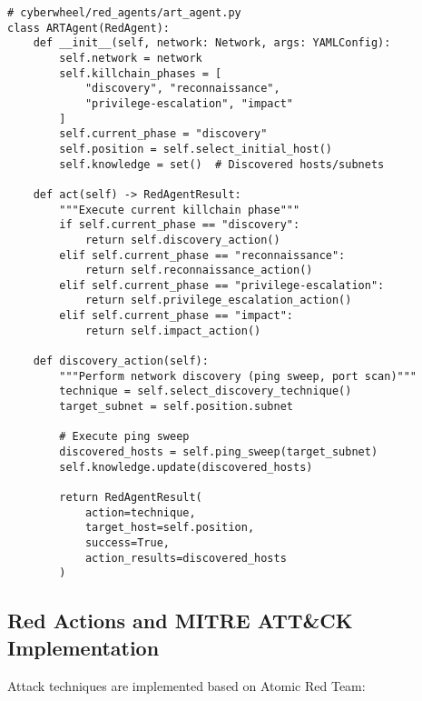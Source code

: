 \documentclass[12pt,a4paper]{article}
\begin{document}
\begin{lstlisting}[caption=ART Agent Implementation]
# cyberwheel/red_agents/art_agent.py
class ARTAgent(RedAgent):
    def __init__(self, network: Network, args: YAMLConfig):
        self.network = network
        self.killchain_phases = [
            "discovery", "reconnaissance", 
            "privilege-escalation", "impact"
        ]
        self.current_phase = "discovery"
        self.position = self.select_initial_host()
        self.knowledge = set()  # Discovered hosts/subnets
        
    def act(self) -> RedAgentResult:
        """Execute current killchain phase"""
        if self.current_phase == "discovery":
            return self.discovery_action()
        elif self.current_phase == "reconnaissance":
            return self.reconnaissance_action()
        elif self.current_phase == "privilege-escalation":
            return self.privilege_escalation_action()
        elif self.current_phase == "impact":
            return self.impact_action()
            
    def discovery_action(self):
        """Perform network discovery (ping sweep, port scan)"""
        technique = self.select_discovery_technique()
        target_subnet = self.position.subnet
        
        # Execute ping sweep
        discovered_hosts = self.ping_sweep(target_subnet)
        self.knowledge.update(discovered_hosts)
        
        return RedAgentResult(
            action=technique,
            target_host=self.position,
            success=True,
            action_results=discovered_hosts
        )
\end{lstlisting}

\subsection{Red Actions and MITRE ATT\&CK Implementation}
Attack techniques are implemented based on Atomic Red Team:
\end{document}
